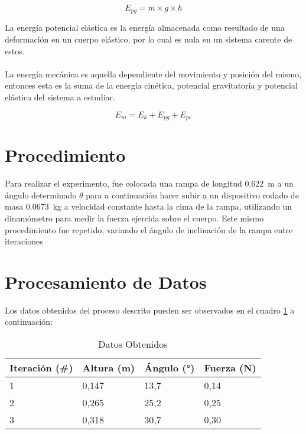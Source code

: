 \documentclass{article}
\begin{document}
\begin{equation}
E_{pg} = m \times g \times h
\end{equation}

La energía potencial elástica es la energía almacenada como resultado de una deformación en un cuerpo elástico, por lo cual es nula en un sistema carente de estos.
\\
\\
La energía mecánica es aquella dependiente del movimiento y posición del mismo, entonces esta es la suma de la energía cinética, potencial gravitatoria y potencial elástica del sistema a estudiar.

\begin{equation}
E_m = E_k + E_{pg} + E_{pe}
\label{equation:em}
\end{equation}

\section{Procedimiento}

Para realizar el experimento, fue colocada una rampa de longitud \qty{0,622}{m} a un ángulo determinado $\theta$ para a continuación hacer subir a un dispositivo rodado de masa \qty{0,0673}{kg} a velocidad constante hasta la cima de la rampa, utilizando un dinamómetro para medir la fuerza ejercida sobre el cuerpo. Este mismo procedimiento fue repetido, variando el ángulo de inclinación de la rampa entre iteraciones

\section{Procesamiento de Datos}

Los datos obtenidos del proceso descrito pueden ser observados en el cuadro \ref{table:mediciones} a continuación:

\begin{table}[H]
\centering
\begin{tabular}{|l|l|l|l|}
\hline
\rowcolor[HTML]{C0C0C0} 
Iteración (\#) & Altura (m) & Ángulo (°) & Fuerza (N) \\ \hline
1 & 0,147 & 13,7 & 0,14 \\ \hline
2 & 0,265 & 25,2 & 0,25 \\ \hline
3 & 0,318 & 30,7 & 0,30 \\ \hline
\end{tabular}
\caption{Datos Obtenidos}
\label{table:mediciones}
\end{table}
\end{document}
